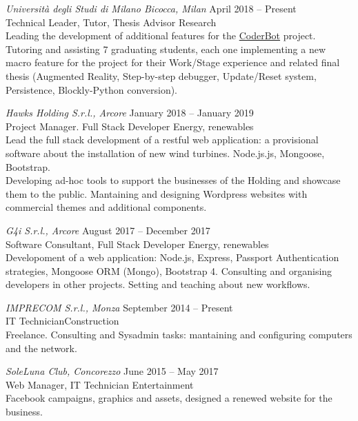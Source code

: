 \documentclass[11pt]{res} %
\begin{document}
\begin{resume}
{\sl Università degli Studi di Milano Bicocca, Milan} \hfill April 2018 -- Present \\
{\sbb Technical Leader, Tutor, Thesis Advisor}  \hfill Research \\
Leading the development of additional features for the \href{ttp://www.coderbot.org/}{CoderBot} project. Tutoring and assisting 7 graduating students, each one implementing a new macro feature for the project for their Work/Stage experience and related final thesis (Augmented Reality, Step-by-step debugger, Update/Reset system, Persistence, Blockly-Python conversion).

{\sl Hawks Holding S.r.l., Arcore} \hfill 
January 2018 -- January 2019 \\
{\sbb Project Manager. Full Stack Developer} \hfill Energy, renewables \\
Lead the full stack development of a restful web application: a provisional software about the installation of new wind turbines. Node.js.js, Mongoose, Bootstrap.\\
Developing ad-hoc tools to support the businesses of the Holding and showcase them to the public. Mantaining and designing Wordpress websites with commercial themes and additional components.

{\sl G4i S.r.l., Arcore} \hfill 
August 2017 -- December 2017\\
{\sbb Software Consultant, Full Stack Developer}   \hfill Energy, renewables  \\
Developoment of a web application: Node.js, Express, Passport Authentication strategies, Mongoose ORM (Mongo), Bootstrap 4. Consulting and organising developers in other projects. Setting and teaching about new workflows.

{\sl IMPRECOM S.r.l., Monza} \hfill 
September 2014 -- Present \\
{\sbb IT Technician}\hfill Construction \\
Freelance. Consulting and Sysadmin tasks: mantaining and configuring computers and the network.

{\sl SoleLuna Club, Concorezzo} \hfill 
June 2015 -- May 2017 \\
{\sbb Web Manager, IT Technician }\hfill Entertainment\\
Facebook campaigns, graphics and assets, designed a renewed website for the business.


\vspace{0.2in} %


\end{resume}
\end{document}
